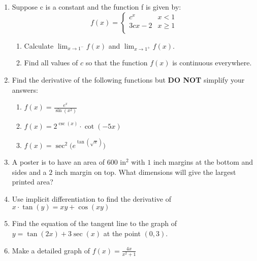 \documentclass[12pt]{article}
\theoremstyle{remark}
\begin{document}
\begin{enumerate}
\item Suppose c is a constant and the function f is given by:
\[ f(x) = \begin{cases} 
      c^x & x<1 \\
      3cx-2 & x \geq 1 \\
   \end{cases}
\]
\begin{enumerate}
\item Calculate $\displaystyle{ \lim_{x \rightarrow 1^-} f(x)}$ and $\displaystyle{ \lim_{x \rightarrow 1^+} f(x)}$.
\item Find all values of $c$ so that the function $f(x)$ is continuous everywhere.
\end{enumerate}
\newpage
\item Find the derivative of the following functions but \textbf{DO NOT} simplify your answers:
\begin{enumerate}
\item $\displaystyle{ f(x) = \frac{e^x}{\sin(x^2)}}$
\vspace{6cm}

\item $\displaystyle{ f(x) = 2^{\csc(x)} \cdot \cot(-5x)}$
\vspace{6cm}

\item $\displaystyle{ f(x) = \sec^2\bigg(e^{\tan(\sqrt{x})}\bigg)}$
\end{enumerate}
\newpage
\item A poster is to have an area of $600 \text{ in}^2$ with $1$ inch margins at
the bottom and sides and a $2$ inch margin on top. What dimensions will
give the largest printed area?
\newpage
\item Use implicit differentiation to find the derivative of $ \displaystyle{ x\cdot \tan(y) = xy+\cos(xy)}$
\vspace{8cm}
\item Find the equation of the tangent line to the graph of $y = \tan(2x) + 3\sec(x)$ at the point $(0,3)$.
\newpage

\item Make a detailed graph of $\displaystyle{ f(x) = \frac{4x}{x^2+1}}$
\end{enumerate}
\end{document}
